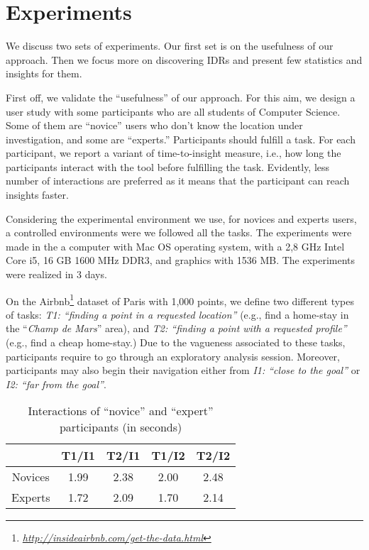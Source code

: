 \documentclass[sigconf,edbt]{acmart-edbt2019}
\begin{document}
\section{Experiments}
\label{sec:experiments}

We discuss two sets of experiments. Our first set is on the usefulness of our approach. Then we focus more on discovering IDRs and present few statistics and insights for them. 

\vspace{2pt}
First off, we validate the ``usefulness'' of our approach. For this aim, we design a user study with some participants who are all students of Computer Science. Some of them are ``novice'' users who don't know the location under investigation, and some are ``experts.'' Participants should fulfill a task. For each participant, we report a variant of time-to-insight measure, i.e., how long the participants interact with the tool before fulfilling the task. Evidently, less number of interactions are preferred as it means that the participant can reach insights faster.

Considering the experimental environment we use, for novices and experts users, a controlled environments were we followed all the tasks. The experiments were made in the a computer with Mac OS operating system, with a 2,8 GHz Intel Core i5, 16 GB 1600 MHz DDR3, and graphics with 1536 MB. The experiments were realized in 3 days.

\vspace{2pt}
On the \textsf{Airbnb}\footnote{\it \url{http://insideairbnb.com/get-the-data.html}} dataset of Paris with 1,000 points, we define two different types of tasks: {\em T1: ``finding a point in a requested location''} (e.g., find a home-stay in the ``\textit{Champ de Mars}'' area), and {\em T2: ``finding a point with a requested profile''} (e.g., find a cheap home-stay.) Due to the vagueness associated to these tasks, participants require to go through an exploratory analysis session. Moreover, participants may also begin their navigation either from {\em I1: ``close to the goal''} or {\em I2: ``far from the goal''}. 


\begin{table}[t]
\centering
\caption{Interactions of ``novice'' and ``expert'' participants (in seconds)}
\label{tbl:novice}
\begin{tabular}{c|c|c|c|c|}
\cline{2-5}
                                       	& \textbf{T1/I1} 	& \textbf{T2/I1} 	& \textbf{T1/I2}	& \textbf{T2/I2}	\\ \hline
\multicolumn{1}{|c|}{Novices} 				& 1.99            	& 2.38	          	& 2.00              & 2.48              \\ \hline
\multicolumn{1}{|c|}{Experts} 				& 1.72            	& 2.09	          	& 1.70              & 2.14              \\ \hline
\end{tabular}
\end{table}
\end{document}
